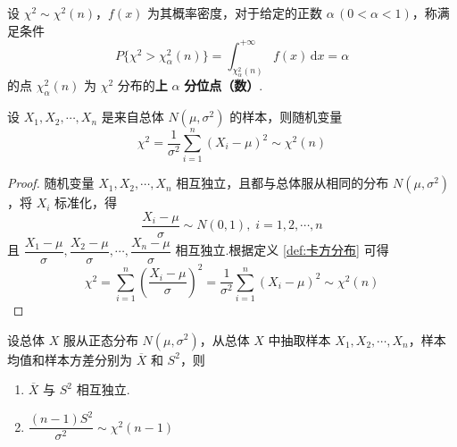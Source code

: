 \begin{definition}
    设 $\chi^2 \sim \chi^2(n)$，$f(x)$ 为其概率密度，对于给定的正数 $\alpha \, (0 < \alpha < 1)$，称满足条件
    $$
    P \{ \chi^2 > \chi_{\alpha}^2(n) \} = \int_{\chi_{\alpha}^2(n)}^{+\infty} f(x) \, \text{d}x = \alpha
    $$
    的点 $\chi_{\alpha}^2(n)$ 为 $\chi^2$ 分布的\textbf{上} $\alpha$ \textbf{分位点（数）}.
\end{definition}

\begin{theorem} \label{theorem:来自正态总体的样本标准化后求和，服从卡方分布}
    设 $X_1,X_2,\cdots,X_n$ 是来自总体 $N(\mu,\sigma^2)$ 的样本，则随机变量
    $$
    \chi^2 = \dfrac{1}{\sigma^2} \sum_{i=1}^n (X_i - \mu)^2 \sim \chi^2(n)
    $$
\end{theorem}

\begin{proof}
    随机变量 $X_1,X_2,\cdots,X_n$ 相互独立，且都与总体服从相同的分布 $N(\mu,\sigma^2)$，将 $X_i$ 标准化，得
    $$
    \dfrac{X_i - \mu}{\sigma} \sim N(0,1), \; i=1,2,\cdots,n
    $$
    且 $\dfrac{X_1 - \mu}{\sigma}, \dfrac{X_2 - \mu}{\sigma},\cdots, \dfrac{X_n - \mu}{\sigma}$ 相互独立.根据定义 \ref{def:卡方分布} 可得
    $$
    \chi^2 = \sum_{i=1}^n \left( \dfrac{X_i - \mu}{\sigma} \right)^2 = \dfrac{1}{\sigma^2} \sum_{i=1}^n (X_i - \mu)^2 \sim \chi^2(n)
    $$
\end{proof}

\begin{theorem} \label{theorem:正态总体的样本均值与样本方差相互独立}
    设总体 $X$ 服从正态分布 $N(\mu,\sigma^2)$，从总体 $X$ 中抽取样本 $X_1,X_2,\cdots,X_n$，样本均值和样本方差分别为 $\overline{X}$ 和 $S^2$，则

    \begin{enumerate}
        \item $\overline{X}$ 与 $S^2$ 相互独立. \vspace{0.5em}
        \item $\dfrac{(n-1) S^2}{\sigma^2} \sim \chi^2(n-1)$
    \end{enumerate}
\end{theorem}

\vspace{-1.8em}

